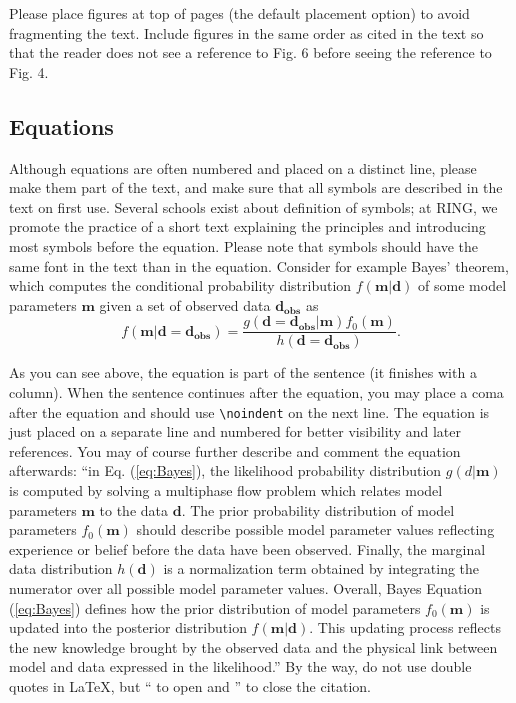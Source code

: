 \documentclass[final]{ring}
\begin{document}
Please place figures at top of pages (the default placement option) to avoid fragmenting the text. Include figures in the same order as cited in the text so that the reader does not see a reference to Fig. 6 before seeing the reference to Fig. 4. 


\subsection{Equations}
Although equations are often numbered and placed on a distinct line, please make them part of the text, and make sure that all symbols are described in the text on first use. Several schools exist about definition of symbols; at RING, we promote the practice of a short text explaining the principles and introducing most symbols before the equation. Please note that symbols should have the same font in the text than in the equation. Consider for example Bayes’ theorem, which computes the conditional probability distribution $f(\mathbf{m}|\mathbf{d})$ of some model parameters $\mathbf{m}$ given a set of observed data $\mathbf{d_{obs}}$ as
\begin{equation}
f(\mathbf{m}| \mathbf{d} = \mathbf{d_{obs}} )=
    \frac{g( \mathbf{d} = \mathbf{d_{obs}} |\mathbf{m}) f_0(\mathbf{m})} 
    {h( \mathbf{d} = \mathbf{d_{obs}} )}.
\label{eq:Bayes}
\end{equation}

\noindent As you can see above, the equation is part of the sentence (it finishes with a column). When the sentence continues after the equation, you may place a coma after the equation and should use \verb|\noindent| on the next line. The equation is just placed on a separate line and numbered for better visibility and later references. You may of course further describe and comment the equation afterwards: ``in Eq. (\ref{eq:Bayes}), the likelihood probability distribution $g(d|\mathbf{m})$ is computed by solving a multiphase flow problem which relates model parameters $\mathbf{m}$ to the data $\mathbf{d}$. The prior probability distribution of model parameters $f_0 (\mathbf{m})$ should describe possible model parameter values reflecting experience or belief before the data have been observed. Finally, the marginal data distribution $h(\mathbf{d})$ is a normalization term obtained by integrating the numerator over all possible model parameter values. Overall, Bayes Equation (\ref{eq:Bayes}) defines how the prior distribution of model parameters $f_0 (\mathbf{m})$ is updated into the posterior distribution $f(\mathbf{m}|\mathbf{d})$. This updating process reflects the new knowledge brought by the observed data and the physical link between model and data expressed in the likelihood.'' By the way, do not use double quotes in  \LaTeX, but `` to open and '' to close the citation. 
\end{document}
